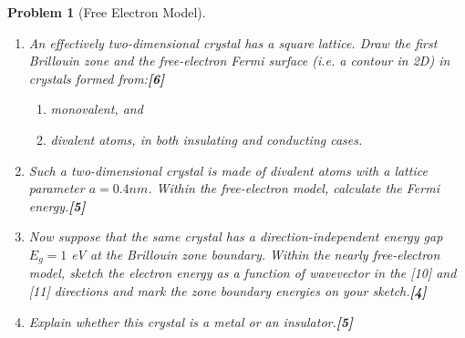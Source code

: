 \documentclass[a4paper]{article}
\theoremstyle{new}
\newtheorem{qns}{Problem}[subsection]
\begin{document}
\begin{qns}[Free Electron Model]\leavevmode
\begin{enumerate}[label=(\alph*)]
\item An effectively two-dimensional crystal has a square lattice. Draw the first Brillouin zone and the free-electron Fermi surface (i.e. a contour in 2D) in crystals formed from:\hfill\textbf{[6]}
\begin{enumerate}[label=\roman*]
    \item monovalent, and
    \item divalent atoms, in both insulating and conducting cases.
\end{enumerate}
\item Such a two-dimensional crystal is made of divalent atoms with a lattice parameter $a = 0.4 nm$. Within the free-electron model, calculate the Fermi energy.\hfill\textbf{[5]}
\item Now suppose that the same crystal has a direction-independent energy gap $E_g = 1$ eV at the Brillouin zone boundary. Within the nearly free-electron model, sketch the electron energy as a function of wavevector in the [10] and [11] directions and mark the zone boundary energies on your sketch.\hfill\textbf{[4]}
\item Explain whether this crystal is a metal or an insulator.\hfill\textbf{[5]}
\end{enumerate}
\end{qns}
\end{document}
